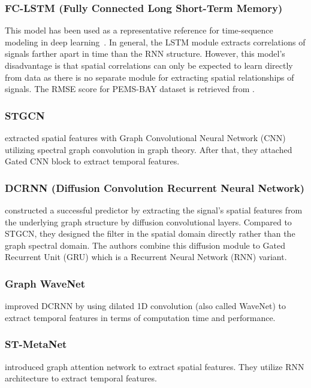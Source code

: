 \documentclass[journal]{IEEEtran}
\begin{document}
\subsubsection{FC-LSTM (Fully Connected Long Short-Term Memory)} 
This model has been used as a representative reference for time-sequence modeling in deep learning~\cite{hochreiter1997long}.
In general, the LSTM module extracts correlations of signals farther apart in time than the RNN structure. However, this model's disadvantage is that spatial correlations can only be expected to learn directly from data as there is no separate module for extracting spatial relationships of signals.
The RMSE score for PEMS-BAY dataset is retrieved from \cite{li2018diffusion}.
\subsubsection{STGCN} \textcite{yu2018spatio} extracted spatial features with Graph Convolutional Neural Network (CNN) utilizing spectral graph convolution in graph theory. After that, they attached Gated CNN block to extract temporal features.
\subsubsection{DCRNN (Diffusion Convolution Recurrent Neural Network)} 
\textcite{li2018diffusion} constructed a successful predictor by extracting the signal's spatial features from the underlying graph structure by diffusion convolutional layers. 
Compared to STGCN, they designed the filter in the spatial domain directly rather than the graph spectral domain. 
The authors combine this diffusion module to Gated Recurrent Unit (GRU) which is a Recurrent Neural Network (RNN) variant.
\subsubsection{Graph WaveNet}
\textcite{xu2018graph} improved DCRNN by using dilated 1D convolution (also called WaveNet) to extract temporal features in terms of computation time and performance.
\subsubsection{ST-MetaNet}
\textcite{pan2019urban} introduced graph attention network to extract spatial features. They utilize RNN architecture to extract temporal features.
\end{document}

